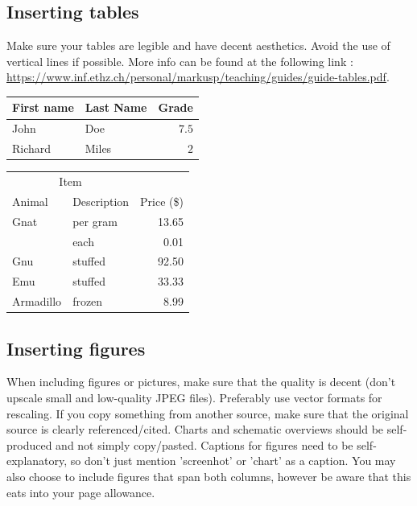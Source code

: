 \documentclass[conference]{IEEEtran}
\begin{document}
\subsection{Inserting tables}

Make sure your tables are legible and have decent aesthetics. Avoid the use of vertical lines if possible. More info can be found at the following link : \url{https://www.inf.ethz.ch/personal/markusp/teaching/guides/guide-tables.pdf}.

\vspace{0.5cm}
\begin{tabular}{llr}
  \toprule
  First name & Last Name & Grade \\
  \midrule
  John & Doe & $7.5$ \\
  Richard & Miles & $2$ \\
  \bottomrule
  \end{tabular}

  \vspace{0.5cm}

  \begin{tabular}{llr}  
    \toprule
    \multicolumn{2}{c}{Item} \\
    \cmidrule(r){1-2}
    Animal    & Description & Price (\$) \\
    \midrule
    Gnat      & per gram    & 13.65      \\
          &    each     & 0.01       \\
    Gnu       & stuffed     & 92.50      \\
    Emu       & stuffed     & 33.33      \\
    Armadillo & frozen      & 8.99       \\
    \bottomrule
  \end{tabular}

  
\subsection{Inserting figures}

When including figures or pictures, make sure that the quality is decent (don't upscale small and low-quality JPEG files). Preferably use vector formats for rescaling. If you copy something from another source, make sure that the original source is clearly referenced/cited. Charts and schematic overviews should be self-produced and not simply copy/pasted. Captions for figures need to be self-explanatory, so don't just mention 'screenhot' or 'chart' as a caption. You may also choose to include figures that span both columns, however be aware that this eats into your page allowance.
\end{document}
